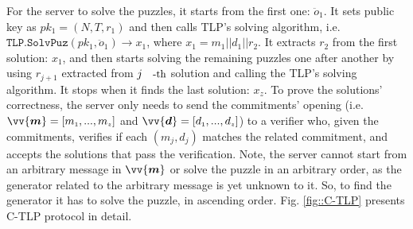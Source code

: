    For the server to  solve the puzzles, it  starts from the first one:  $\ddot{o}_{\scriptscriptstyle 1}$. It sets public key as $pk_{\scriptscriptstyle 1}=(N,T,r_{\scriptscriptstyle 1})$ and then calls  TLP's solving algorithm, i.e. $\mathtt{TLP.SolvPuz}(pk_{\scriptscriptstyle 1},\ddot{o}_{\scriptscriptstyle 1})\rightarrow x_{\scriptscriptstyle 1}$, where $x_{\scriptscriptstyle 1}=m_{\scriptscriptstyle 1}||d_{\scriptscriptstyle 1}||r_{\scriptscriptstyle 2}$. It  extracts $r_{\scriptscriptstyle 2}$ from the first solution: $x_{\scriptscriptstyle 1}$, and then  starts solving the remaining puzzles  one after another by using $r_{\scriptscriptstyle j+1}$ extracted from $j\text{\small{-th}}$ solution and calling the TLP's solving algorithm. It stops when it finds the last solution: $x_{\scriptscriptstyle z}$. To prove the solutions' correctness, the server only needs to send the commitments' opening (i.e.  $\vv{\bm{m}}=[m_{\scriptscriptstyle 1},...,m_{\scriptscriptstyle z}]$ and $\vv{\bm{d}}=[d_{\scriptscriptstyle 1},...,d_{\scriptscriptstyle z}]$) to a verifier who,  given  the commitments, verifies if each $(m_{\scriptscriptstyle j},d_{\scriptscriptstyle j})$ matches the related commitment,    and accepts the solutions that pass the verification. Note, the server cannot start from an arbitrary message in $\vv{\bm{m}}$ or solve the puzzle in an arbitrary order, as the generator related to the arbitrary message is yet  unknown  to it. So, to find the generator it has to solve the puzzle, in ascending  order. Fig. \ref{fig::C-TLP} presents C-TLP protocol in detail. 
   
   \vspace{-2mm}
   


 
  
%   


